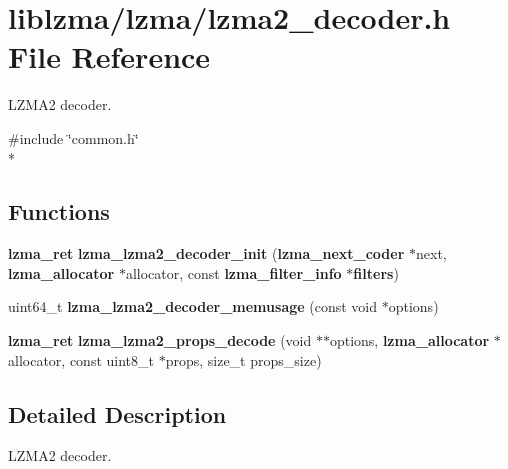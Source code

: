 \section{liblzma/lzma/lzma2\-\_\-decoder.h File Reference}
\label{lzma2__decoder_8h}


L\-Z\-M\-A2 decoder.  


{\ttfamily \#include \char`\"{}common.\-h\char`\"{}}\\*
\subsection*{Functions}
\begin{DoxyCompactItemize}
\item 
{\bf lzma\-\_\-ret} {\bfseries lzma\-\_\-lzma2\-\_\-decoder\-\_\-init} ({\bf lzma\-\_\-next\-\_\-coder} $\ast$next, {\bf lzma\-\_\-allocator} $\ast$allocator, const {\bf lzma\-\_\-filter\-\_\-info} $\ast${\bf filters})\label{lzma2__decoder_8h_a9f69ff763aa8af96210c6ff7a8e5c24b}

\item 
uint64\-\_\-t {\bfseries lzma\-\_\-lzma2\-\_\-decoder\-\_\-memusage} (const void $\ast$options)\label{lzma2__decoder_8h_a1c1e1c878fab104400c9917efc2e2e1c}

\item 
{\bf lzma\-\_\-ret} {\bfseries lzma\-\_\-lzma2\-\_\-props\-\_\-decode} (void $\ast$$\ast$options, {\bf lzma\-\_\-allocator} $\ast$allocator, const uint8\-\_\-t $\ast$props, size\-\_\-t props\-\_\-size)\label{lzma2__decoder_8h_a425d290efc30c370f99e6106280836d0}

\end{DoxyCompactItemize}


\subsection{Detailed Description}
L\-Z\-M\-A2 decoder. 